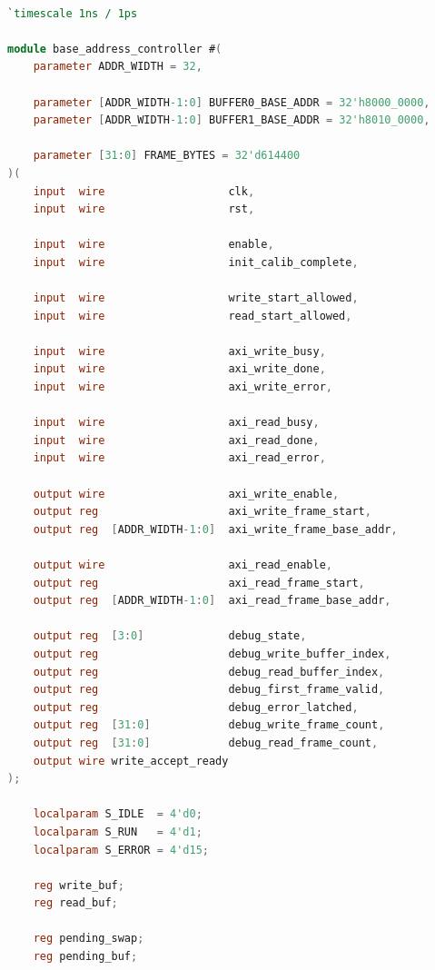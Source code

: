     \begin{lstlisting}[language=Verilog, title={Kode \emph{Base Address Controller} untuk mengatur \emph{double buffer memory}}, label={code:double-biffer-mem}]

`timescale 1ns / 1ps

module base_address_controller #(
    parameter ADDR_WIDTH = 32,

    parameter [ADDR_WIDTH-1:0] BUFFER0_BASE_ADDR = 32'h8000_0000,
    parameter [ADDR_WIDTH-1:0] BUFFER1_BASE_ADDR = 32'h8010_0000,

    parameter [31:0] FRAME_BYTES = 32'd614400
)(
    input  wire                   clk,
    input  wire                   rst,

    input  wire                   enable,
    input  wire                   init_calib_complete,

    input  wire                   write_start_allowed,
    input  wire                   read_start_allowed,

    input  wire                   axi_write_busy,
    input  wire                   axi_write_done,
    input  wire                   axi_write_error,

    input  wire                   axi_read_busy,
    input  wire                   axi_read_done,
    input  wire                   axi_read_error,

    output wire                   axi_write_enable,
    output reg                    axi_write_frame_start,
    output reg  [ADDR_WIDTH-1:0]  axi_write_frame_base_addr,

    output wire                   axi_read_enable,
    output reg                    axi_read_frame_start,
    output reg  [ADDR_WIDTH-1:0]  axi_read_frame_base_addr,

    output reg  [3:0]             debug_state,
    output reg                    debug_write_buffer_index,
    output reg                    debug_read_buffer_index,
    output reg                    debug_first_frame_valid,
    output reg                    debug_error_latched,
    output reg  [31:0]            debug_write_frame_count,
    output reg  [31:0]            debug_read_frame_count,
    output wire write_accept_ready
);

    localparam S_IDLE  = 4'd0;
    localparam S_RUN   = 4'd1;
    localparam S_ERROR = 4'd15;

    reg write_buf;
    reg read_buf;

    reg pending_swap;
    reg pending_buf;


\end{lstlisting}
